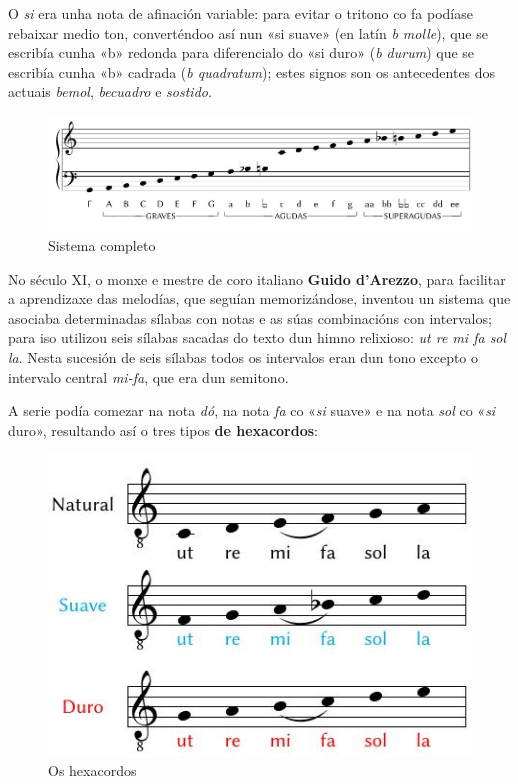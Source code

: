 \documentclass[a4paper, twoside]{templates/ociamthesis}
\begin{document}
O \emph{si} era unha nota de afinación variable: para evitar o tritono co fa podíase rebaixar medio ton, converténdoo así nun «si suave» (en latín \emph{b molle}), que se escribía cunha «b» redonda para diferencialo do «si duro» (\emph{b durum}) que se escribía cunha «b» cadrada (\emph{b quadratum}); estes signos son os antecedentes dos actuais \emph{bemol}, \emph{becuadro} e \emph{sostido}.

\begin{figure}
\centering
\includegraphics{figures/ud-03/sistemaCompleto.jpg}
\caption{Sistema completo}
\end{figure}

No século XI, o monxe e mestre de coro italiano \textbf{Guido d'Arezzo}, para facilitar a aprendizaxe das melodías, que seguían memorizándose, inventou un sistema que asociaba determinadas sílabas con notas e as súas combinacións con intervalos; para iso utilizou seis sílabas sacadas do texto dun himno relixioso: \emph{ut re mi fa sol la}. Nesta sucesión de seis sílabas todos os intervalos eran dun tono excepto o intervalo central \emph{mi-fa}, que era dun semitono.

A serie podía comezar na nota \emph{dó}, na nota \emph{fa} co «\emph{si} suave» e na nota \emph{sol} co «\emph{si} duro», resultando así o tres tipos \textbf{de hexacordos}:

\begin{figure}
\centering
\includegraphics{figures/ud-03/hexacordos.jpg}
\caption{Os hexacordos}
\end{figure}
\end{document}
